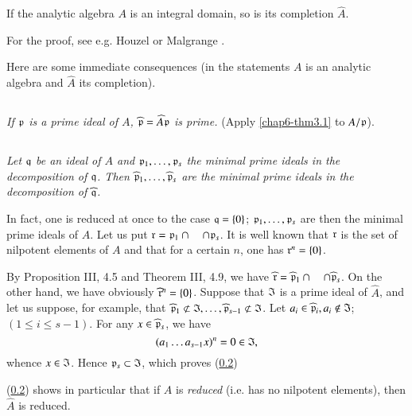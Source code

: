 \begin{theorem}\label{chap6-thm3.1}
If the analytic algebra $A$ is an integral domain, so is its completion $\widehat{A}$.
\end{theorem}

For the proof, see e.g. Houzel \cite{C. Houzel : 1} or Malgrange \cite{B. Malgrange : 3}.

Here are some immediate consequences (in the statements $A$ is an analytic algebra and $\widehat{A}$ its completion).

\setcounter{subsection}{1}
\subsection{}\label{chap6-sec3.2}
{\em If $\mathfrak{p}$ is a prime ideal of $A$, $\widehat{\mathfrak{p}}=\widehat{A}\mathfrak{p}$ is prime.} (Apply \eqref{chap6-thm3.1} to $A/\mathfrak{p}$).

\subsection{}\label{chap6-sec3.3}
{\em Let $\mathfrak{q}$ be an ideal of $A$ and $\mathfrak{p}_{1},\ldots,\mathfrak{p}_{s}$ the minimal prime ideals in the decomposition of $\mathfrak{q}$. Then $\widehat{\mathfrak{p}}_{1},\ldots,\widehat{\mathfrak{p}}_{s}$ are the minimal prime ideals in the decomposition of $\widehat{\mathfrak{q}}$.}

In fact, one is reduced at once to the case $\mathfrak{q}=\{0\}$; $\mathfrak{p}_{1},\ldots,\mathfrak{p}_{s}$ are then the minimal prime ideals of $A$. Let us put $\mathfrak{r}=\mathfrak{p}_{1}\cap\quad \cap \mathfrak{p}_{s}$. It is well known that $\mathfrak{r}$ is the set of nilpotent elements of $A$ and that for a certain $n$, one has $\mathfrak{r}^{n}=\{0\}$.

By Proposition III, 4.5 and Theorem III, 4.9, we have $\widehat{\mathfrak{r}}=\widehat{\mathfrak{p}}_{1}\cap\quad\cap \widehat{\mathfrak{p}}_{s}$. On the other hand, we have obviously $\widehat{\mathfrak{r}}^{n}=\{0\}$. Suppose that $\mathfrak{I}$ is a prime ideal of $\widehat{A}$, and let us suppose, for example, that $\widehat{\frakp}_{1}\nsubset \frakI,\ldots,\widehat{\frakp}_{s-1}\nsubset \frakI$. Let $a_{i}\in \widehat{\mathfrak{p}}_{i},a_{i}\not\in \mathfrak{I}$; $(1\leq i\leq s-1)$. For any $x\in \widehat{\mathfrak{p}}_{s}$, we have
$$
(a_{1}\ldots a_{s-1}x)^{n}=0\in\mathfrak{I},
$$
whence $x\in \mathfrak{I}$. Hence $\mathfrak{p}_{s}\subset \mathfrak{I}$, which proves (\ref{chap6-sec3.3})

(\ref{chap6-sec3.3}) shows in particular that if $A$ is {\em reduced} (i.e. has no nilpotent elements), then $\widehat{A}$ is reduced.

